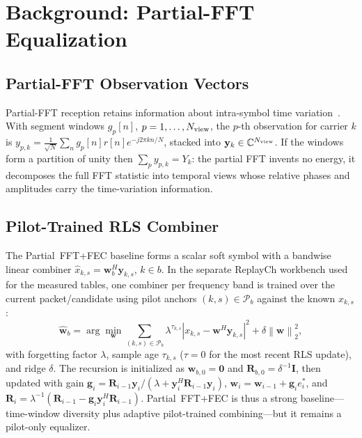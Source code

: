 \documentclass[journal]{IEEEtran}
\newcommand{\C}{\mathbb{C}}
\newcommand{\Ht}{^{H}}
\newcommand{\norm}[1]{\left\lVert #1 \right\rVert}
\newcommand{\abs}[1]{\left\lvert #1 \right\rvert}
\begin{document}
\section{Background: Partial-FFT Equalization}\label{sec:background}
\subsection{Partial-FFT Observation Vectors}
Partial-FFT reception retains information about intra-symbol time
variation~\cite{yerramalli2012partialfft}. With segment windows $g_p[n]$,
$p=1,\dots,N_{\rm view}$, the $p$-th observation for carrier $k$ is
$y_{p,k}=\tfrac{1}{\sqrt N}\sum_{n}g_p[n]r[n]e^{-j2\pi kn/N}$, stacked into
$\mathbf y_k\in\C^{N_{\rm view}}$. If the windows form a partition of unity then
$\sum_p y_{p,k}=Y_k$: the partial FFT invents no energy, it decomposes the full
FFT statistic into temporal views whose relative phases and amplitudes carry the
time-variation information.

\subsection{Pilot-Trained RLS Combiner}
The Partial~FFT+FEC baseline forms a scalar soft symbol with a bandwise linear
combiner $\widehat x_{k,s}=\mathbf w_{b}\Ht\mathbf y_{k,s}$, $k\in b$. In the
separate ReplayCh workbench used for the measured tables, one combiner per
frequency band is trained over the
current packet/candidate using pilot anchors $(k,s)\in\mathcal P_b$ against the
known $x_{k,s}$:
\begin{equation}
  \widehat{\mathbf w}_b=\arg\min_{\mathbf w}\!\!\sum_{(k,s)\in\mathcal P_b}\!\!
  \lambda^{\tau_{k,s}}\abs{x_{k,s}-\mathbf w\Ht\mathbf y_{k,s}}^2+\delta\norm{\mathbf w}_2^2,
  \label{eq:pfft-ls}
\end{equation}
with forgetting factor $\lambda$, sample age $\tau_{k,s}$ ($\tau=0$ for the most
recent RLS update), and ridge $\delta$. The recursion is initialized as
$\mathbf w_{b,0}=\mathbf 0$ and $\mathbf R_{b,0}=\delta^{-1}\mathbf I$, then
updated with gain $\mathbf g_i=\mathbf R_{i-1}\mathbf y_i/(\lambda+\mathbf
y_i\Ht\mathbf R_{i-1}\mathbf y_i)$, $\mathbf w_i=\mathbf w_{i-1}+\mathbf g_i
e_i^*$, and $\mathbf R_i=\lambda^{-1}(\mathbf R_{i-1}-\mathbf g_i\mathbf y_i\Ht
\mathbf R_{i-1})$. Partial~FFT+FEC is thus a strong baseline---time-window
diversity plus adaptive pilot-trained combining---but it remains a
pilot-only equalizer.
\end{document}
